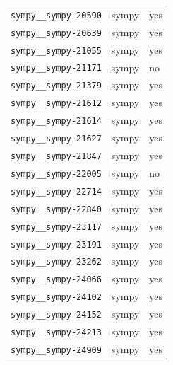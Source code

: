 \begin{longtable}{@{}p{}lp{}@{}}
\texttt{sympy\_\_sympy-20590} & sympy & yes \\
\texttt{sympy\_\_sympy-20639} & sympy & yes \\
\texttt{sympy\_\_sympy-21055} & sympy & yes \\
\texttt{sympy\_\_sympy-21171} & sympy & no \\
\texttt{sympy\_\_sympy-21379} & sympy & yes \\
\texttt{sympy\_\_sympy-21612} & sympy & yes \\
\texttt{sympy\_\_sympy-21614} & sympy & yes \\
\texttt{sympy\_\_sympy-21627} & sympy & yes \\
\texttt{sympy\_\_sympy-21847} & sympy & yes \\
\texttt{sympy\_\_sympy-22005} & sympy & no \\
\texttt{sympy\_\_sympy-22714} & sympy & yes \\
\texttt{sympy\_\_sympy-22840} & sympy & yes \\
\texttt{sympy\_\_sympy-23117} & sympy & yes \\
\texttt{sympy\_\_sympy-23191} & sympy & yes \\
\texttt{sympy\_\_sympy-23262} & sympy & yes \\
\texttt{sympy\_\_sympy-24066} & sympy & yes \\
\texttt{sympy\_\_sympy-24102} & sympy & yes \\
\texttt{sympy\_\_sympy-24152} & sympy & yes \\
\texttt{sympy\_\_sympy-24213} & sympy & yes \\
\texttt{sympy\_\_sympy-24909} & sympy & yes \\
\end{longtable}
